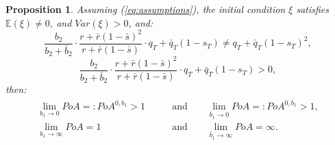\documentclass[11pt]{article}
\newtheorem{proposition}{Proposition}
\begin{document}
\begin{proposition}\label{prop:b1_b1bar}
	Assuming (\ref{eq:assumptions}), the initial condition $\xi$ satisfies $\mathbb{E}(\xi)\neq 0$, and $Var(\xi)>0$, and:
	\begin{equation*}
	\frac{b_2}{b_2+\bar{b}_2}\cdot \frac{r + \bar{r}(1- \bar{s})^2}{r + \bar{r}(1-\bar{s})}\cdot q_T+\bar{q}_T(1-s_T) \neq q_T+\bar{q}_T(1-s_T)^2,
	\end{equation*}
	\begin{equation*}
	\frac{b_2}{b_2+\bar{b}_2}\cdot \frac{r + \bar{r}(1- \bar{s})^2}{r + \bar{r}(1-\bar{s})}\cdot q_T+\bar{q}_T(1-s_T) >0,
	\end{equation*}
	then:
	\begin{equation*}
	\begin{split}
	    \lim_{b_1 \to 0} PoA =: PoA^{0,b_1} > 1\qquad &\text{and} \qquad \lim_{\bar{b}_1 \to 0} PoA =: PoA^{0,\bar{b}_1} > 1,\\
	    \lim_{b_1 \to \infty} PoA = 1 \qquad &\text{and} \qquad\lim_{\bar{b}_1 \to \infty} PoA =\infty.
	\end{split}
	\end{equation*}
\end{proposition}
\end{document}
